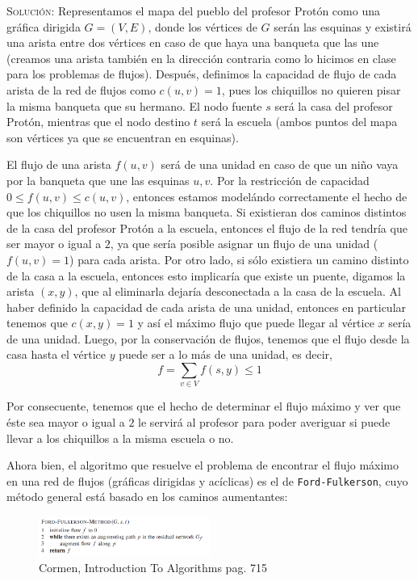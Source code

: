 \documentclass[letterpaper,11pt]{article}
\begin{document}
\begin{enumerate}
    \textsc{Solución:} Representamos el mapa del pueblo del profesor Protón como 
    una gráfica dirigida $G = (V, E)$, donde los vértices de $G$ serán las 
    esquinas y existirá una arista entre dos vértices en caso de que haya una 
    banqueta que las une (creamos una arista también en la dirección contraria 
    como lo hicimos en clase para los problemas de flujos). Después, definimos 
    la capacidad de flujo de cada arista de la red de flujos como $c(u,v) = 1$, 
    pues los chiquillos no quieren pisar la misma banqueta que su hermano. El
    nodo fuente $s$ será la casa del profesor Protón, mientras que el nodo 
    destino $t$ será la escuela (ambos puntos del mapa son vértices ya que se 
    encuentran en esquinas). 

    El flujo de una arista $f(u,v)$ será de una unidad en caso de que un niño
    vaya por la banqueta que une las esquinas $u, v$. Por la restricción de 
    capacidad $0 \leq f(u,v) \leq c(u,v)$, entonces estamos modelándo 
    correctamente el hecho de que los chiquillos no usen la misma banqueta. 
    Si existieran dos caminos distintos de la casa del profesor Protón a la 
    escuela, entonces el flujo de la red tendría que ser mayor o igual a $2$, ya 
    que sería posible asignar un flujo de una unidad ($f(u,v) = 1$) para cada 
    arista. Por otro lado, si sólo existiera un camino distinto de la casa a 
    la escuela, entonces esto implicaría que existe un puente, digamos la arista
    $(x,y)$, que al eliminarla dejaría desconectada a la casa de la escuela. 
    Al haber definido la capacidad de cada arista de una unidad, entonces en 
    particular tenemos que $c(x,y) = 1$ y así el máximo flujo que puede llegar
    al vértice $x$ sería de una unidad. Luego, por la conservación de flujos, 
    tenemos que el flujo desde la casa hasta el vértice $y$ puede ser a lo más 
    de una unidad, es decir, 
    \begin{equation*}
        f = \sum_{v \in V} f(s, y) \leq 1
    \end{equation*}

    Por consecuente, tenemos que el hecho de determinar el flujo máximo y ver 
    que éste sea mayor o igual a $2$ le servirá al profesor para poder 
    averiguar si puede llevar a los chiquillos a la misma escuela o no.

    Ahora bien, el algoritmo que resuelve el problema de encontrar el flujo 
    máximo en una red de flujos (gráficas dirigidas y acíclicas) es el de 
    \texttt{Ford-Fulkerson}, cuyo método general está basado en los caminos 
    aumentantes:
    \begin{figure}[H]
        \centering
        \includegraphics[width=0.5\textwidth]{imagenes/FORD.png}
        \caption{Cormen, Introduction To Algorithms pag. 715}
    \end{figure}


\end{enumerate}
\end{document}
